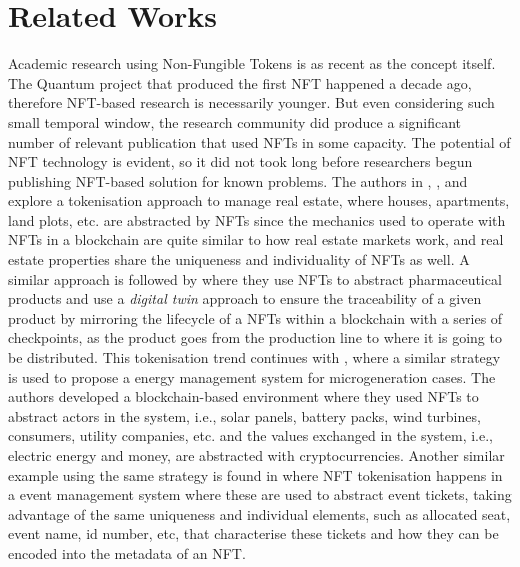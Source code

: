 \documentclass[../NFTComp_IEEE.tex]{subfiles}
\begin{document}
\section{Related Works}
\label{sec:related_works}
Academic research using Non-Fungible Tokens is as recent as the concept itself. The Quantum project that produced the first NFT happened a decade ago, therefore NFT-based research is necessarily younger. But even considering such small temporal window, the research community did produce a significant number of relevant publication that used NFTs in some capacity. The potential of NFT technology is evident, so it did not took long before researchers begun publishing NFT-based solution for known problems. The authors in \cite{Hung2023}, \cite{Barbuta2024}, and \cite{Sharma2024} explore a tokenisation approach to manage real estate, where houses, apartments, land plots, etc. are abstracted by NFTs since the mechanics used to operate with NFTs in a blockchain are quite similar to how real estate markets work, and real estate properties share the uniqueness and individuality of NFTs as well. A similar approach is followed by \cite{Chiacchio2022} where they use NFTs to abstract pharmaceutical products and use a \textit{digital twin} approach to ensure the traceability of a given product by mirroring the lifecycle of a NFTs within a blockchain with a series of checkpoints, as the product goes from the production line to where it is going to be distributed. This tokenisation trend continues with \cite{Karandikar2021}, where a similar strategy is used to propose a energy management system for microgeneration cases. The authors developed a blockchain-based environment where they used NFTs to abstract actors in the system, i.e., solar panels, battery packs, wind turbines, consumers, utility companies, etc. and the values exchanged in the system, i.e., electric energy and money, are abstracted with cryptocurrencies. Another similar example using the same strategy is found in \cite{Regner2019} where NFT tokenisation happens in a event management system where these are used to abstract event tickets, taking advantage of the same uniqueness and individual elements, such as allocated seat, event name, id number, etc, that characterise these tickets and how they can be encoded into the metadata of an NFT.
\par
\end{document}
